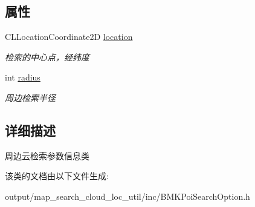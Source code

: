 \subsection*{属性}
\begin{DoxyCompactItemize}
\item 
\hypertarget{interface_b_m_k_nearby_search_option_ac03907184a27878ce07e1fce8ee38d3e}{C\+L\+Location\+Coordinate2\+D \hyperlink{interface_b_m_k_nearby_search_option_ac03907184a27878ce07e1fce8ee38d3e}{location}}\label{interface_b_m_k_nearby_search_option_ac03907184a27878ce07e1fce8ee38d3e}

\begin{DoxyCompactList}\small\item\em 检索的中心点，经纬度 \end{DoxyCompactList}\item 
\hypertarget{interface_b_m_k_nearby_search_option_ad3a9f2d3cc3668165c229741b8791f90}{int \hyperlink{interface_b_m_k_nearby_search_option_ad3a9f2d3cc3668165c229741b8791f90}{radius}}\label{interface_b_m_k_nearby_search_option_ad3a9f2d3cc3668165c229741b8791f90}

\begin{DoxyCompactList}\small\item\em 周边检索半径 \end{DoxyCompactList}\end{DoxyCompactItemize}


\subsection{详细描述}
周边云检索参数信息类 

该类的文档由以下文件生成\+:\begin{DoxyCompactItemize}
\item 
output/map\+\_\+search\+\_\+cloud\+\_\+loc\+\_\+util/inc/B\+M\+K\+Poi\+Search\+Option.\+h\end{DoxyCompactItemize}
